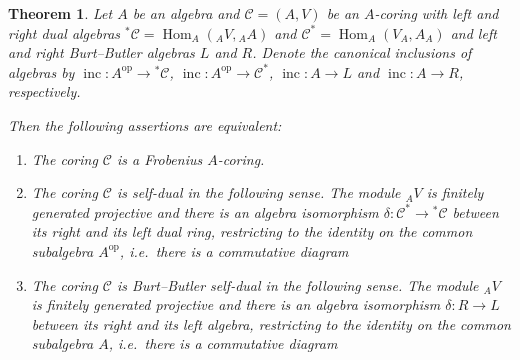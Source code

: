 \documentclass[12pt,a4paper]{amsart}
\theoremstyle{plain}
\newtheorem{thm}{Theorem}[section]
\theoremstyle{definition}
\numberwithin{equation}{thm}
\DeclareMathOperator{\Hom}{Hom}
\DeclareMathOperator{\op}{op}
\DeclareMathOperator{\incl}{inc}
\begin{document}
{\setcounter{thm}{0}

\renewcommand*{\thethm}{\Alph{thm}}
\begin{thm} \label{mainthm1}
  Let $A$ be an algebra and $\mathcal{C} = (A,V)$ be an $A$-coring with left and
  right dual algebras ${}^{\ast}{\mathcal C} =  \Hom_A({}_AV,{}_AA)$ and
  ${\mathcal C}^{\ast} =  \Hom_{A}(V_A,A_A)$ and left and
  right Burt--Butler algebras $L$ and $R$. Denote the canonical inclusions
  of algebras by $\incl\colon A^{\op} \rightarrow {}^{\ast}{\mathcal C}$, $\incl\colon A^{\op}
  \rightarrow {\mathcal C}^{\ast}$, $\incl\colon A \rightarrow L$ and
  $\incl\colon A \rightarrow R$, respectively.
  
  Then the following assertions are equivalent:
\begin{enumerate}
\item\label{mainthm1:1} The coring $\mathcal{C}$ is a Frobenius $A$-coring.

\item\label{mainthm1:2} The coring $\mathcal{C}$ is self-dual in the following sense. The module ${}_AV$ is finitely generated projective and
  there is an algebra isomorphism $\delta\colon \mathcal{C}^\ast \rightarrow {}^{\ast}\mathcal{C}$
  between its right and its left dual
  ring, restricting to the identity on the common subalgebra $A^{\op}$,
  i.e.\ there is a commutative diagram
  
   \begin{center}
\end{center}
  
\item\label{mainthm1:3} The coring $\mathcal{C}$ is Burt--Butler self-dual in the following sense. The module ${}_AV$ is finitely generated projective and
  there is an algebra isomorphism $\delta\colon R \rightarrow L$
  between its right and its left
  algebra, restricting to the identity on the common subalgebra $A$,
  i.e.\ there is a commutative diagram 

   \begin{center}
\end{center}


\end{enumerate}
\end{thm}}
\end{document}
